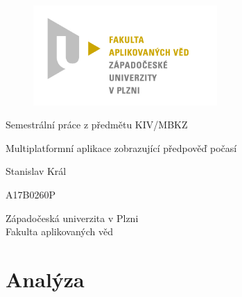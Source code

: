 \documentclass[12pt, a4paper]{article}
\let\oldsection\section
\renewcommand\section{\clearpage\oldsection}
\begin{document}
	\renewcommand{\lstlistingname}{Ukázka kódu}
	\renewcommand{\lstlistlistingname}{Seznam ukázek kódu}
    \begin{titlepage}

       \centering

       \vspace*{\baselineskip}

       \begin{figure}[H]
          \centering
          \includegraphics[width=7cm]{img/fav-logo.jpg}
       \end{figure}

       \vspace*{1\baselineskip}
       {\sc Semestrální práce z předmětu KIV/MBKZ}
       \vspace*{1\baselineskip}

       \vspace{0.75\baselineskip}

       {\LARGE\sc Multiplatformní aplikace zobrazující předpověď počasí\\}

       \vspace{4\baselineskip}
       
		\vspace{0.5\baselineskip}

       
       {\sc\Large Stanislav Král \\}

       \vspace{0.5\baselineskip}

       {A17B0260P}

       \vfill

       {\sc Západočeská univerzita v Plzni\\
       Fakulta aplikovaných věd}


    \end{titlepage}


    \tableofcontents
    \pagebreak


   \section{Analýza}
\end{document}
